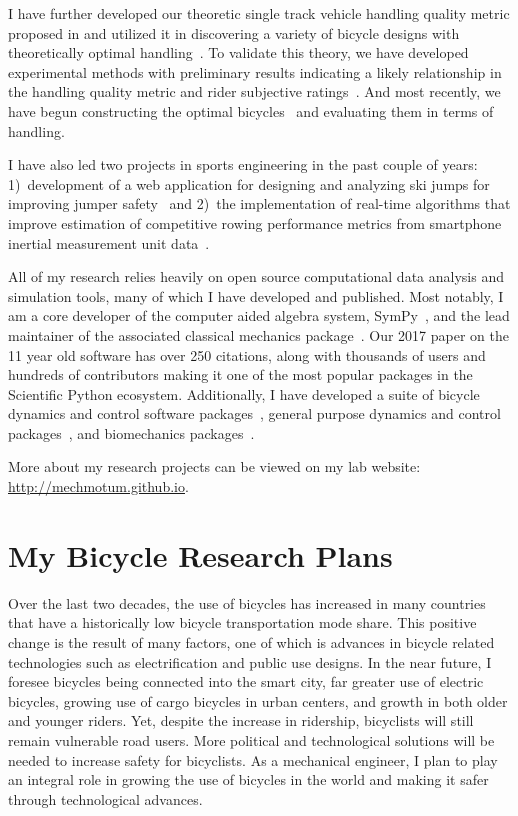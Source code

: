 \documentclass{article}
\begin{document}
I have further developed our theoretic single track vehicle handling quality
metric proposed in \cite{Hess2012} and utilized it in discovering a variety of
bicycle designs with theoretically optimal
handling~\cite{Moore2016,Moore2019a}. To validate this theory, we have
developed experimental methods with preliminary results indicating a likely
relationship in the handling quality metric and rider subjective
ratings~\cite{Kresie2017}. And most recently, we have begun constructing the
optimal bicycles~\cite{Gilboa2019a} and evaluating them in terms of handling.

I have also led two projects in sports engineering in the past couple of years:
1)~development of a web application for designing and analyzing ski jumps for
improving jumper safety~\cite{Moore2018a,Cloud2019a} and 2)~the implementation
of real-time algorithms that improve estimation of competitive rowing performance
metrics from smartphone inertial measurement unit data~\cite{Cloud2019b}.

All of my research relies heavily on open source computational data analysis
and simulation tools, many  of which I have developed and published. Most
notably, I am a core developer of the computer aided algebra system,
SymPy~\cite{SymPyDevelopmentTeam2006}, and the lead maintainer of the
associated classical mechanics package~\cite{Gede2013}. Our 2017 paper
\cite{Meurer2017} on the 11 year old software has over 250 citations, along
with thousands of users and hundreds of contributors making it one of the most
popular packages in the Scientific Python ecosystem. Additionally, I have
developed a suite of bicycle dynamics and control software
packages~\cite{Moore2010b,Moore2011d,Moore2011a,Moore2011e}, general purpose
dynamics and control packages~\cite{Moore2014,Moore2011}, and biomechanics
packages~\cite{Dembia2011,Moore2011,Moore2011b,Moore2013b}.

More about my research projects can be viewed on my lab website:
\url{http://mechmotum.github.io}.

\section*{My Bicycle Research Plans}
%
Over the last two decades, the use of bicycles has increased in many countries
that have a historically low bicycle transportation mode share. This positive
change is the result of many factors, one of which is advances in bicycle
related technologies such as electrification and public use designs. In the
near future, I foresee bicycles being connected into the smart city, far
greater use of electric bicycles, growing use of cargo bicycles in urban
centers, and growth in both older and younger riders. Yet, despite the increase
in ridership, bicyclists will still remain vulnerable road users. More
political and technological solutions will be needed to increase safety for
bicyclists. As a mechanical engineer, I plan to play an integral role in
growing the use of bicycles in the world and making it safer through
technological advances.
\end{document}
